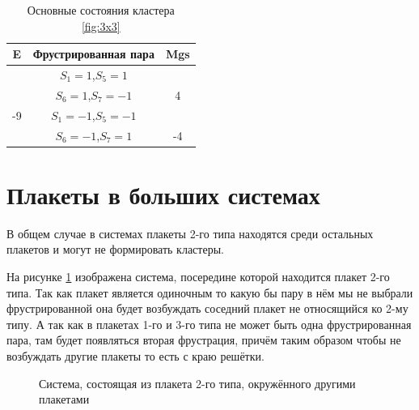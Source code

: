 \documentclass[utf8, babel, sor, jor, amsmath, amssymb, reprint]{elsarticle} %
\begin{document}
\begin{table}[H]
	\centering
	\begin{tabular}{|c|c|c|}
		\hline
		E   &   Фрустрированная пара & Mgs\\
		\hline
		   &  $S_1=1$,$S_5=1$&\\
		&    $S_6=1$,$S_7=-1$ & 4\\
	\cline{2-3}
		-9	\multirow{3}{*}{}
		   &  $S_1=-1$,$S_5=-1$&\\
		&    $S_6=-1$,$S_7=1$ & -4\\
		\hline
	\end{tabular}
	\caption{Основные состояния кластера \ref{fig:3x3}}
	\label{tab:gscl}
\end{table} 

\section{Плакеты в больших системах}

В общем случае в системах плакеты 2-го типа находятся среди остальных плакетов и могут не формировать кластеры.

На рисунке \ref{fig:4x4} изображена система, посередине которой находится плакет 2-го типа. Так как плакет является одиночным то какую бы пару в нём мы не выбрали фрустрированной она будет возбуждать соседний плакет не относящийся ко 2-му типу. А так как в плакетах 1-го и 3-го типа не может быть одна фрустрированная пара, там будет появляться вторая фрустрация, причём таким образом чтобы не возбуждать другие плакеты то есть с краю решётки.

\begin{figure}[H]
	\centering
	\caption{Система, состоящая из плакета 2-го типа, окружённого другими плакетами}
	\label{fig:4x4}
\end{figure}
\end{document}
